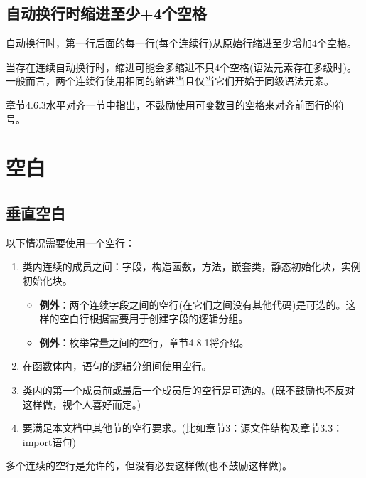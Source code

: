 \documentclass[cn,11pt,chinese]{elegantbook}
\begin{document}
\subsection{自动换行时缩进至少+4个空格}
自动换行时，第一行后面的每一行(每个连续行)从原始行缩进至少增加4个空格。

当存在连续自动换行时，缩进可能会多缩进不只4个空格(语法元素存在多级时)。一般而言，两个连续行使用相同的缩进当且仅当它们开始于同级语法元素。

章节4.6.3水平对齐一节中指出，不鼓励使用可变数目的空格来对齐前面行的符号。

\section{空白}
\subsection{垂直空白}
以下情况需要使用一个空行：
\begin{enumerate}
	\item 类内连续的成员之间：字段，构造函数，方法，嵌套类，静态初始化块，实例初始化块。
	\begin{itemize}
		\item \textbf{例外}：两个连续字段之间的空行(在它们之间没有其他代码)是可选的。这样的空白行根据需要用于创建字段的逻辑分组。
		\item \textbf{例外}：枚举常量之间的空行，章节4.8.1将介绍。
	\end{itemize}
	\item 在函数体内，语句的逻辑分组间使用空行。
	\item 类内的第一个成员前或最后一个成员后的空行是可选的。(既不鼓励也不反对这样做，视个人喜好而定。)
	\item 要满足本文档中其他节的空行要求。(比如章节3：源文件结构及章节3.3：import语句)
\end{enumerate}

多个连续的空行是允许的，但没有必要这样做(也不鼓励这样做)。
\end{document}
